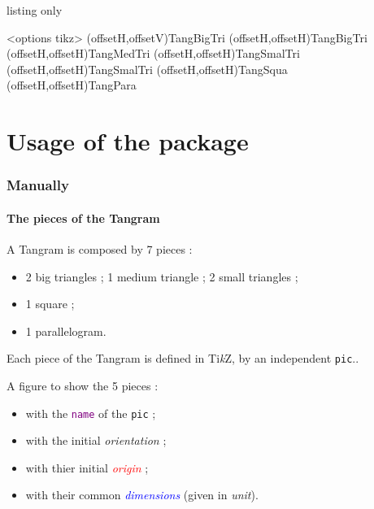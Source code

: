 \documentclass{article}
\providecommand\tikzlogo{Ti\textit{k}Z}
\begin{document}
\begin{PresentationCode}{listing only}
\begin{EnvTangramTikz}[keys]<options tikz>
	(offsetH,offsetV){TangBigTri}
	(offsetH,offsetH){TangBigTri}
	(offsetH,offsetH){TangMedTri}
	(offsetH,offsetH){TangSmalTri}
	(offsetH,offsetH){TangSmalTri}
	(offsetH,offsetH){TangSqua}
	(offsetH,offsetH){TangPara}
\end{EnvTangramTikz}
\end{PresentationCode}

\pagebreak

\part{Usage of the package}

\section{Manually}

\subsection{The pieces of the Tangram}

A Tangram is composed by 7 pieces :
\begin{itemize}
	\item 2 big triangles ; 1 medium triangle ; 2 small triangles ;
	\item 1 square ;
	\item 1 parallelogram.
\end{itemize}

Each piece of the Tangram is defined in \tikzlogo, by an independent \texttt{pic}..

\medskip

A figure to show the 5 pieces :

\begin{itemize}
	\item with the \textcolor{purple}{\texttt{name}} of the \texttt{pic} ;
	\item with the initial \textit{orientation}  ;
	\item with thier initial \textcolor{red}{\textit{origin}} ;
	\item with their common \textcolor{blue}{\textit{dimensions}} (given in \textit{unit}).
\end{itemize}
\end{document}
